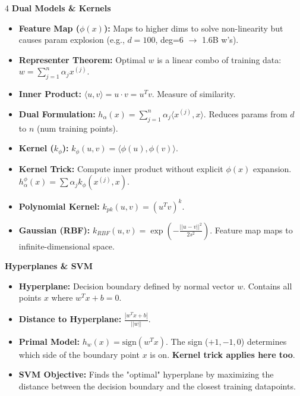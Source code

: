\documentclass[8pt,landscape,a4paper]{extarticle}
\begin{document}
\begin{multicols*}{4}
\vspace{1mm}
\noindent\textbf{Dual Models \& Kernels}
\begin{itemize}[leftmargin=*, nosep]
    \item \textbf{Feature Map ($\phi(x)$):} Maps to higher dims to solve non-linearity but causes param explosion (e.g., $d=100$, deg=6 $\rightarrow$ 1.6B w's).
    \item \textbf{Representer Theorem:} Optimal $w$ is a linear combo of training data: $w = \sum_{j=1}^n \alpha_j x^{(j)}$.
    \item \textbf{Inner Product:} $\langle u, v \rangle = u \cdot v = u^Tv$. Measure of similarity.
    \item \textbf{Dual Formulation:} $h_\alpha(x) = \sum_{j=1}^n \alpha_j \langle x^{(j)}, x \rangle$. Reduces params from $d$ to $n$ (num training points).
    \item \textbf{Kernel ($k_\phi$):}  $k_\phi(u,v) = \langle \phi(u), \phi(v) \rangle$.
    \item \textbf{Kernel Trick:} Compute inner product without explicit $\phi(x)$ expansion. $h_\alpha^\phi(x) = \sum \alpha_j k_\phi(x^{(j)}, x)$.
    \item \textbf{Polynomial Kernel:} $k_{pk}(u,v) = (u^T v)^k$.
    \item \textbf{Gaussian (RBF):} $k_{RBF}(u,v) = \exp(-\frac{||u-v||^2}{2s^2})$. Feature map maps to infinite-dimensional space.
\end{itemize}

\vspace{1mm}
\noindent\textbf{Hyperplanes \& SVM}
\begin{itemize}[leftmargin=*, nosep]
    \item \textbf{Hyperplane:} Decision boundary defined by normal vector $w$. Contains all points $x$ where $w^T x + b = 0$.
    \item \textbf{Distance to Hyperplane:} $\frac{|w^T x + b|}{||w||}$.
    \item \textbf{Primal Model:} $h_w(x) = \text{sign}(w^T x)$. The sign ($+1, -1, 0$) determines which side of the boundary point $x$ is on. \textbf{Kernel trick applies here too}.
    \item \textbf{SVM Objective:} Finds the "optimal" hyperplane by maximizing the distance between the decision boundary and the closest training datapoints.
\end{itemize}


\end{multicols*}
\end{document}
